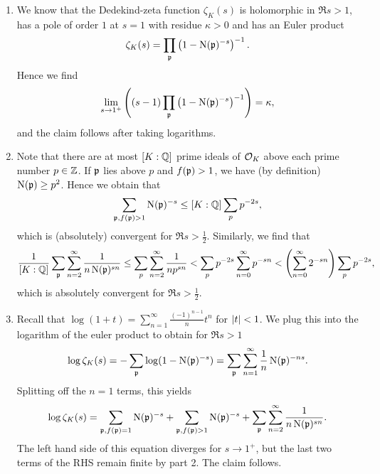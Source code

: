 \documentclass[a4paper,11pt]{article}
\begin{document}
\begin{enumerate}
    \item We know that the Dedekind-zeta function $\zeta_K(s)$ is holomorphic
        in $\Re s >1$, has a pole of order $1$ at $s=1$ with residue $\kappa
        >0$
        and has an Euler product
        \begin{equation*}
            \zeta_K(s) = \prod_{\mathfrak{p}} \left(1- \operatorname{N}(\mathfrak{p})^{-s}\right)^{-1}.
        \end{equation*}
        Hence we find
        \begin{equation*}
            \lim_{s \to 1^+} \left((s-1) \prod_{\mathfrak{p}} \left(1- \operatorname{N}(\mathfrak{p})^{-s}\right)^{-1} 
                \right)
            = \kappa,
        \end{equation*}
        and the claim follows after taking logarithms.
    \item Note that there are at most $[K:\mathbb{Q}]$ prime ideals of $\mathcal{O}_K$ above
        each prime number $p \in \mathbb{Z}$. If $\mathfrak{p}$ lies above $p$ and $f(\mathfrak{p})>1$,
        we have (by definition) $\operatorname{N}(\mathfrak{p})\geq p^2$. Hence we obtain that 
        \begin{equation*}
            \sum_{\mathfrak{p}, f(\mathfrak{p})>1} \operatorname{N}(\mathfrak{p})^{-s} \leq 
            [K:\mathbb{Q}] \sum_{p} p^{-2s}, 
        \end{equation*}
        which is (absolutely) convergent for $\Re s > \frac 12$. Similarly, we find that 
        \begin{equation*}
            \frac{1}{[K:\mathbb{Q}]} \sum_{\mathfrak{p}} \sum_{n=2}^\infty \frac 1{n \operatorname{N}(\mathfrak{p})^{sn}}
            \leq \sum_p \sum_{n=2}^\infty \frac 1{np^{sn}}
            < \sum_p p^{-2s} \sum_{n=0}^\infty p^{-sn} 
            < \left( \sum_{n=0}^\infty 2^{-sn}\right) \sum_p p^{-2s},
        \end{equation*}
        which is absolutely convergent for $\Re s > \frac 12$.

    \item Recall that $\log(1+t) = \sum_{n=1}^\infty \frac {(-1)^{n-1}}n t^{n}$ for
        $\left\lvert t \right\rvert < 1$. We plug this
        into the logarithm of the euler product to obtain for $\Re s > 1$
        \begin{equation*}
            \log \zeta_K(s) = -\sum_{\mathfrak{p}} \log(1- \operatorname{N}(\mathfrak{p})^{-s})
            = \sum_{\mathfrak{p}} \sum_{n=1}^\infty \frac 1n \operatorname{N}(\mathfrak{p})^{-ns}.
        \end{equation*}
        Splitting off the $n=1$ terms, this yields
        \begin{equation*}
            \log \zeta_K(s) = \sum_{\mathfrak{p}, f(\mathfrak{p}) = 1} \operatorname{N}(\mathfrak{p})^{-s} 
            + \sum_{\mathfrak{p}, f(\mathfrak{p})>1} \operatorname{N}(\mathfrak{p})^{-s} + 
            \sum_{\mathfrak{p}} \sum_{n=2}^\infty \frac{1}{n \operatorname{N}(\mathfrak{p})^{sn}}.
        \end{equation*}
        The left hand side of this equation diverges for $s \to 1^+$, but the last 
        two terms of the RHS remain finite by part 2. The claim follows.
        
\end{enumerate}

\contactend
\end{document}
